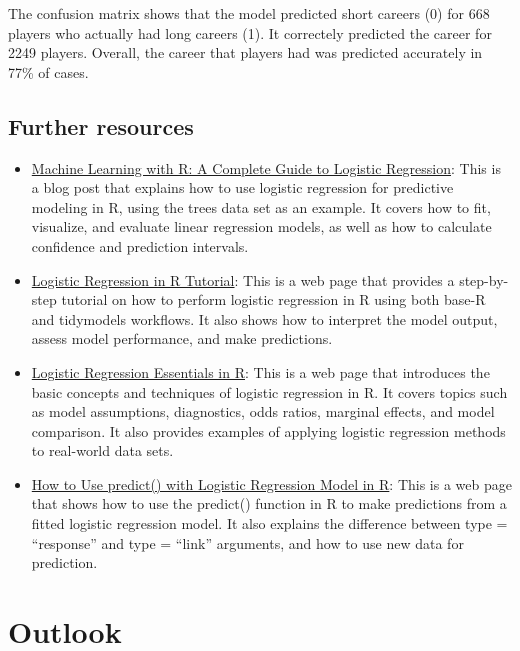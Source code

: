 \documentclass[
]{book}
\providecommand{\tightlist}{%
  \setlength{\itemsep}{0pt}\setlength{\parskip}{0pt}}
\begin{document}
The confusion matrix shows that the model predicted short careers (0) for 668 players who actually had long careers (1). It correctely predicted the career for 2249 players. Overall, the career that players had was predicted accurately in 77\% of cases.

\hypertarget{further-resources-8}{%
\section{Further resources}\label{further-resources-8}}

\begin{itemize}
\tightlist
\item
  \href{https://www.r-bloggers.com/2021/01/machine-learning-with-r-a-complete-guide-to-logistic-regression/}{Machine Learning with R: A Complete Guide to Logistic Regression}: This is a blog post that explains how to use logistic regression for predictive modeling in R, using the trees data set as an example. It covers how to fit, visualize, and evaluate linear regression models, as well as how to calculate confidence and prediction intervals.
\item
  \href{https://www.datacamp.com/tutorial/logistic-regression-R}{Logistic Regression in R Tutorial}: This is a web page that provides a step-by-step tutorial on how to perform logistic regression in R using both base-R and tidymodels workflows. It also shows how to interpret the model output, assess model performance, and make predictions.
\item
  \href{http://sthda.com/english/articles/36-classification-methods-essentials/151-logistic-regression-essentials-in-r/}{Logistic Regression Essentials in R}: This is a web page that introduces the basic concepts and techniques of logistic regression in R. It covers topics such as model assumptions, diagnostics, odds ratios, marginal effects, and model comparison. It also provides examples of applying logistic regression methods to real-world data sets.
\item
  \href{https://www.statology.org/r-logistic-regression-predict/}{How to Use predict() with Logistic Regression Model in R}: This is a web page that shows how to use the predict() function in R to make predictions from a fitted logistic regression model. It also explains the difference between type = ``response'' and type = ``link'' arguments, and how to use new data for prediction.
\end{itemize}

\hypertarget{out-look}{%
\chapter{Outlook}\label{out-look}}
\end{document}
